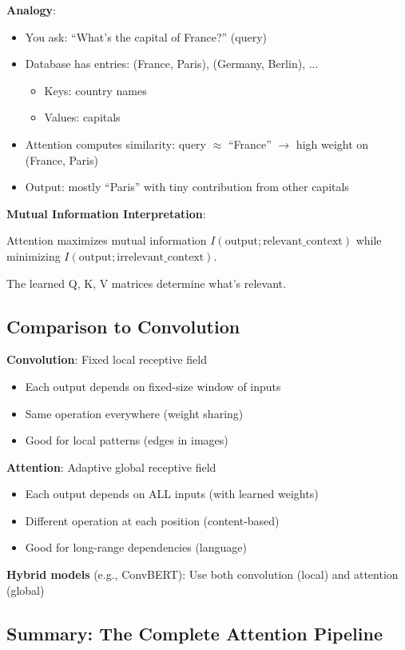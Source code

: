\textbf{Analogy}:
\begin{itemize}
\item You ask: ``What's the capital of France?'' (query)
\item Database has entries: (France, Paris), (Germany, Berlin), ...
\begin{itemize}
\item Keys: country names
\item Values: capitals
\end{itemize}
\item Attention computes similarity: query $\approx$ ``France'' $\to$ high weight on (France, Paris)
\item Output: mostly ``Paris'' with tiny contribution from other capitals
\end{itemize}

\textbf{Mutual Information Interpretation}:

Attention maximizes mutual information $I(\text{output}; \text{relevant\_context})$ while minimizing $I(\text{output}; \text{irrelevant\_context})$.

The learned Q, K, V matrices determine what's relevant.

\subsection{Comparison to Convolution}

\textbf{Convolution}: Fixed local receptive field
\begin{itemize}
\item Each output depends on fixed-size window of inputs
\item Same operation everywhere (weight sharing)
\item Good for local patterns (edges in images)
\end{itemize}

\textbf{Attention}: Adaptive global receptive field
\begin{itemize}
\item Each output depends on ALL inputs (with learned weights)
\item Different operation at each position (content-based)
\item Good for long-range dependencies (language)
\end{itemize}

\textbf{Hybrid models} (e.g., ConvBERT): Use both convolution (local) and attention (global)

\subsection{Summary: The Complete Attention Pipeline}

